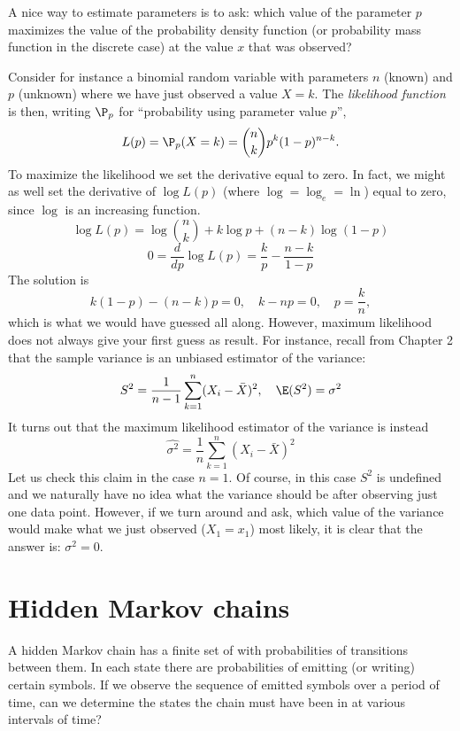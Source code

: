 	A nice way to estimate parameters is to ask: which value of the parameter $p$ maximizes the value of the probability density function (or probability mass function in the discrete case) at the value $x$ that was observed?

	Consider for instance a binomial random variable with parameters $n$ (known) and $p$ (unknown) where we have just observed a value $X=k$. The \emph{likelihood function} is then, writing $\P_p$ for ``probability using parameter value $p$'',
	\[
		L(p) = \P_p(X=k) = \binom{n}{k} p^k (1-p)^{n-k}.
	\]
	To maximize the likelihood we set the derivative equal to zero. In fact, we might as well set the derivative of $\log L(p)$ (where $\log=\log_e=\ln$) equal to zero, since $\log$ is an increasing function.
	\[
		\log L(p) = \log\binom{n}{k} + k\log p + (n-k)\log (1-p)
	\]
	\[
		0 = \frac{d}{dp} \log L(p) = \frac{k}p - \frac{n-k}{1-p}
	\]
	The solution is
	\[
		k(1-p) - (n-k)p = 0,\quad k-np=0,\quad p = \frac{k}n,
	\]
	which is what we would have guessed all along.
	However, maximum likelihood does not always give your first guess as result.
	For instance, recall from Chapter 2 that the sample variance is an unbiased estimator of the variance:
	\[
		S^2 = \frac1{n-1}\sum_{k=1}^n (X_i-\bar X)^2,\quad \E(S^2)=\sigma^2
	\]
	It turns out that the maximum likelihood estimator of the variance is instead
	\[
		\widehat{\sigma^2} = \frac1{n}\sum_{k=1}^n (X_i-\bar X)^2
	\]
	Let us check this claim in the case $n=1$. Of course, in this case $S^2$ is undefined and we naturally have no idea what the variance should be after observing just one data point. However, if we turn around and ask, which value of the variance would make what we just observed ($X_1=x_1$) most likely, it is clear that the answer is: $\sigma^2=0$.
\section{Hidden Markov chains}
	A hidden Markov chain has a finite set of  with probabilities of transitions between them.
	In each state there are probabilities of emitting (or writing) certain symbols.
	If we observe the sequence of emitted symbols over a period of time, can we determine the states the chain must have been in at various intervals of time?

